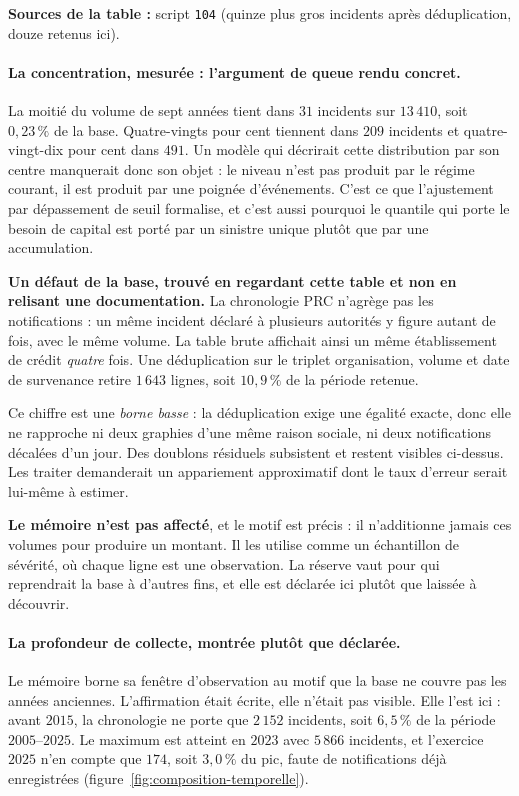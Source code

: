\noindent\textbf{Sources de la table :} script \texttt{104} (quinze plus gros incidents après
déduplication, douze retenus ici).

\paragraph{La concentration, mesurée : l'argument de queue rendu concret.} La moitié du
volume de sept années tient dans $31$ incidents sur $13\,410$, soit $0{,}23\,\%$ de la
base. Quatre-vingts pour cent tiennent dans $209$ incidents et quatre-vingt-dix pour cent dans
$491$. Un modèle qui décrirait cette distribution par son centre manquerait donc son objet : le
niveau n'est pas produit par le régime courant, il est produit par une poignée d'événements.
C'est ce que l'ajustement par dépassement de seuil formalise, et c'est aussi pourquoi le
quantile qui porte le besoin de capital est porté par un sinistre unique plutôt que par une
accumulation.

\begin{attention}
\textbf{Un défaut de la base, trouvé en regardant cette table et non en relisant une
documentation.} La chronologie PRC n'agrège pas les notifications : un même incident déclaré à
plusieurs autorités y figure autant de fois, avec le même volume. La table brute affichait ainsi
un même établissement de crédit \emph{quatre} fois. Une déduplication sur le triplet
organisation, volume et date de survenance retire $1\,643$ lignes, soit $10{,}9\,\%$ de la
période retenue.

Ce chiffre est une \emph{borne basse} : la déduplication exige une égalité exacte, donc elle ne
rapproche ni deux graphies d'une même raison sociale, ni deux notifications décalées d'un jour.
Des doublons résiduels subsistent et restent visibles ci-dessus. Les traiter demanderait un
appariement approximatif dont le taux d'erreur serait lui-même à estimer.

\textbf{Le mémoire n'est pas affecté}, et le motif est précis : il n'additionne jamais ces
volumes pour produire un montant. Il les utilise comme un échantillon de sévérité, où chaque
ligne est une observation. La réserve vaut pour qui reprendrait la base à d'autres fins, et elle
est déclarée ici plutôt que laissée à découvrir.
\end{attention}

\paragraph{La profondeur de collecte, montrée plutôt que déclarée.} Le mémoire borne sa fenêtre
d'observation au motif que la base ne couvre pas les années anciennes. L'affirmation était
écrite, elle n'était pas visible. Elle l'est ici : avant $2015$, la chronologie ne porte que
$2\,152$ incidents, soit $6{,}5\,\%$ de la période $2005$--$2025$. Le maximum est atteint en
$2023$ avec $5\,866$ incidents, et l'exercice $2025$ n'en compte que $174$, soit $3{,}0\,\%$ du
pic, faute de notifications déjà enregistrées (figure~\ref{fig:composition-temporelle}).

